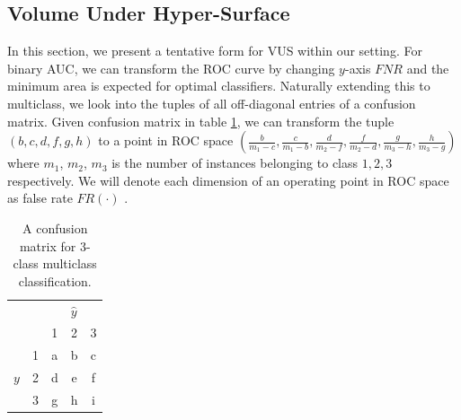 \documentclass[twoside,11pt]{article}
\renewcommand{\>}{{\rightarrow}}
\renewcommand{\hat}{\widehat}
\newcommand{\1}{{\mathbf 1}}
\newcommand{\0}{{\mathbf 0}}
\begin{document}
\subsection{Volume Under Hyper-Surface}
In this section, we present a tentative form for VUS within our setting. For binary AUC, we can transform the ROC curve by changing $y$-axis $FNR$ and the minimum area is expected for optimal classifiers. 
Naturally extending this to multiclass, we look into the tuples of all off-diagonal entries of a confusion matrix. 
Given confusion matrix in table \ref{tab:confusion_matrix}, we can transform the tuple $(b,c,d,f,g,h)$ to a point in ROC space $(\frac{b}{m_1-c}, \frac{c}{m_1-b}, \frac{d}{m_2-f}, \frac{f}{m_2-d}, \frac{g}{m_3-h}, \frac{h}{m_3-g})$ where $m_1$, $m_2$, $m_3$ is the number of instances belonging to class $1,2, 3$ respectively. We will denote each dimension of an operating point in ROC space as false rate $FR(\cdot)$ .
\begin{table}[h]
    \centering
    \begin{tabular}{ccccc}
        
       & & \multicolumn{3}{c}{$\hat{y}$} \\ \cline{2-5}
       &  &  1 & 2 & 3 \\ \cline{2-5}
       & 1 &  a & b & c \\
      $y$ & 2 &  d & e & f \\
       & 3 &  g & h & i \\ \cline{2-5}
        
    \end{tabular}
    \caption{A confusion matrix for 3-class multiclass classification.}
    \label{tab:confusion_matrix}
\end{table}
\end{document}
